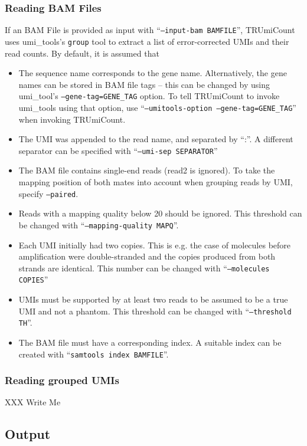 \documentclass[10pt]{article}
\begin{document}
\subsubsection*{Reading BAM Files}

If an BAM File is provided as input with ``\texttt{--input-bam BAMFILE}'', TRUmiCount uses umi\_tools's \texttt{group} tool to extract a list of error-corrected UMIs and their read counts. By default, it is assumed that
\begin{itemize}
  \item The sequence name corresponds to the gene name. Alternatively, the gene names can be stored in BAM file tags -- this can be changed by using umi\_tool's \texttt{--gene-tag=GENE\_TAG} option. To tell TRUmiCount to invoke umi\_tools using that option, use ``\texttt{--umitools-option --gene-tag=\allowbreak GENE\_TAG}'' when invoking TRUmiCount.
  \item The UMI was appended to the read name, and separated by ``:''. A different separator can be specified with ``\texttt{--umi-sep SEPARATOR}''
  \item The BAM file contains single-end reads (read2 is ignored). To take the mapping position of both mates into account when grouping reads by UMI, specify \texttt{--paired}.
  \item Reads with a mapping quality below 20 should be ignored. This threshold can be changed with ``\texttt{--mapping-quality MAPQ}''.
  \item Each UMI initially had two copies. This is e.g. the case of molecules before amplification were double-stranded and the copies produced from both strands are identical. This number can be changed with ``\texttt{--molecules COPIES}''
  \item UMIs must be supported by at least two reads to be assumed to be a true UMI and not a phantom. This threshold can be changed with ``\texttt{--threshold TH}''.
  \item The BAM file must have a corresponding index. A suitable index can be created with ``\texttt{samtools index BAMFILE}''.
\end{itemize}

\subsubsection*{Reading grouped UMIs}

XXX Write Me

\subsection{Output}
\end{document}
